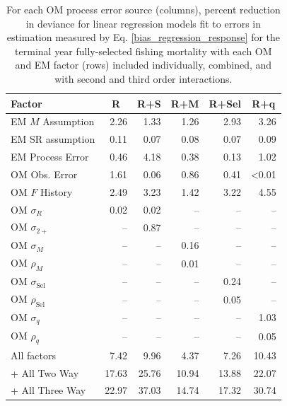 \documentclass[
  12pt,
]{article}
\begin{document}
\begin{table}
\caption{For each OM process error source (columns), percent reduction in deviance for linear regression models fit to errors in estimation measured by Eq. \ref{bias_regression_response} for the terminal year fully-selected fishing mortality with each OM and EM factor (rows) included individually, combined, and with second and third order interactions.}\label{bias_F_PRD_table}
{\begin{center}
\begin{tabular}{lrrrrr}
\hline\hline
\multicolumn{1}{l}{Factor}&\multicolumn{1}{c}{R}&\multicolumn{1}{c}{R+S}&\multicolumn{1}{c}{R+M}&\multicolumn{1}{c}{R+Sel}&\multicolumn{1}{c}{R+q}\tabularnewline
\hline
EM $M$ Assumption& 2.26& 1.33& 1.26& 2.93& 3.26\tabularnewline
EM SR assumption& 0.11& 0.07& 0.08& 0.07& 0.09\tabularnewline
EM Process Error& 0.46& 4.18& 0.38& 0.13& 1.02\tabularnewline
OM Obs. Error& 1.61& 0.06& 0.86& 0.41&\textless  0.01\tabularnewline
OM $F$ History& 2.49& 3.23& 1.42& 3.22& 4.55\tabularnewline
OM $\sigma_R$& 0.02& 0.02&--&--&--\tabularnewline
OM $\sigma_{2+}$ &--& 0.87&--&--&--\tabularnewline
OM $\sigma_M$&--&--& 0.16&--&--\tabularnewline
OM $\rho_M$&--&--& 0.01&--&--\tabularnewline
OM $\sigma_{\text{Sel}}$&--&--&--& 0.24&--\tabularnewline
OM $\rho_{\text{Sel}}$&--&--&--& 0.05&--\tabularnewline
OM $\sigma_q$&--&--&--&--& 1.03\tabularnewline
OM $\rho_q$&--&--&--&--& 0.05\tabularnewline
All factors& 7.42& 9.96& 4.37& 7.26&10.43\tabularnewline
+ All Two Way&17.63&25.76&10.94&13.88&22.07\tabularnewline
+ All Three Way&22.97&37.03&14.74&17.32&30.74\tabularnewline
\hline
\end{tabular}\end{center}
}
\end{table}
\end{document}
